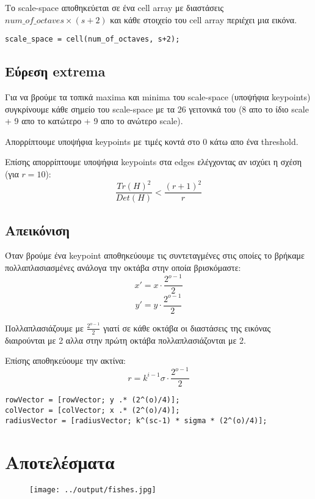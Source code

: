 \documentclass[11pt]{scrartcl} %
\begin{document}
Το scale-space αποθηκεύεται σε ένα cell array με διαστάσεις $num\_of\_octaves \times (s+2)$ και κάθε στοιχείο του cell array περιέχει μια εικόνα.
\begin{verbatim}
scale_space = cell(num_of_octaves, s+2);
\end{verbatim}

\subsection{Εύρεση extrema}

Για να βρούμε τα τοπικά maxima και minima του scale-space (υποψήφια keypoints) συγκρίνουμε κάθε σημείο του scale-space με τα 26 γειτονικά του (8 απο το ίδιο scale + 9 απο το κατώτερο + 9 απο το ανώτερο scale).

Απορρίπτουμε υποψήφια keypoints με τιμές κοντά στο 0 κάτω απο ένα threshold.

Επίσης απορρίπτουμε υποψήφια keypoints στα edges ελέγχοντας αν ισχύει η σχέση (για $r = 10$):
\[\frac{Tr(H)^2}{Det(H)} < \frac{(r+1)^2}{r}\]

\subsection{Απεικόνιση}

Όταν βρούμε ένα keypoint αποθηκεύουμε τις συντεταγμένες στις οποίες το βρήκαμε πολλαπλασιασμένες ανάλογα την οκτάβα στην οποία βρισκόμαστε:
\[x' = x \cdot \frac{2^{o-1}}{2}\]
\[y' = y \cdot \frac{2^{o-1}}{2}\]

Πολλαπλασιάζουμε με $\frac{2^{o-1}}{2}$ γιατί σε κάθε οκτάβα οι διαστάσεις της εικόνας διαιρούνται με 2 αλλα στην πρώτη οκτάβα πολλαπλασιάζονται με 2.

Επίσης αποθηκεύουμε την ακτίνα:
\[r = k^{i-1} \sigma \cdot \frac{2^{o-1}}{2}\]

\begin{verbatim}
rowVector = [rowVector; y .* (2^(o)/4)];
colVector = [colVector; x .* (2^(o)/4)];
radiusVector = [radiusVector; k^(sc-1) * sigma * (2^(o)/4)];
\end{verbatim}

\section{Αποτελέσματα}

\begin{figure}[H]
  \centerline{\texttt{[image: ../output/fishes.jpg]}}
  \caption{}
\end{figure}
\end{document}
